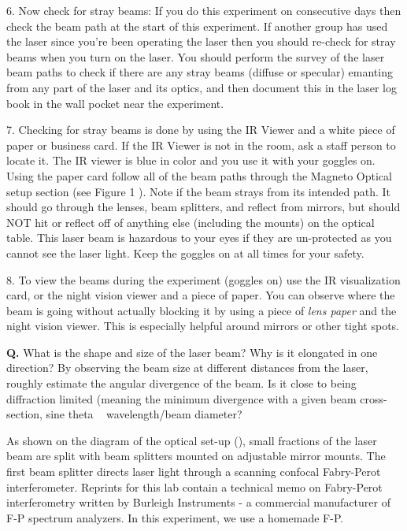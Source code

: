 \documentclass{../lab}
\begin{document}
6. Now check for stray beams: If you do this experiment on consecutive days then check the beam path at the start of this experiment. If another group has used the laser since you're been operating the laser then you should re-check for stray beams when you turn on the laser. You should perform the survey of the laser beam paths to check if there are any stray beams (diffuse or specular) emanting from any part of the laser and its optics, and then document this in the laser log book in the wall pocket near the experiment.

7. Checking for stray beams is done by using the IR Viewer and a white piece of paper or business card. If the IR Viewer is not in the room, ask a staff person to locate it. The IR viewer is blue in color and you use it with your goggles on. Using the paper card follow all of the beam paths through the Magneto Optical setup section (see Figure 1 ). Note if the beam strays from its intended path. It should go through the lenses, beam splitters, and reflect from mirrors, but should NOT hit or reflect off of anything else (including the mounts) on the optical table. This laser beam is hazardous to your eyes if they are un-protected as you cannot see the laser light. Keep the goggles on at all times for your safety.

8. To view the beams during the experiment (goggles on) use the IR visualization card, or the night vision viewer and a piece of paper. You can observe where the beam is going without actually blocking it by using a piece of \emph{lens paper} and the night vision viewer. This is especially helpful around mirrors or other tight spots.

\textbf{Q.} What is the shape and size of the laser beam? Why is it elongated in one direction? By observing the beam size at different distances from the laser, roughly estimate the angular divergence of the beam. Is it close to being diffraction limited (meaning the minimum divergence with a given beam cross-section, sine theta ~ wavelength/beam diameter?

As shown on the diagram of the optical set-up (), small fractions of the laser beam are split with beam splitters mounted on adjustable mirror mounts. The first beam splitter directs laser light through a scanning confocal Fabry-Perot interferometer. Reprints for this lab contain a technical memo on Fabry-Perot interferometry written by Burleigh Instruments - a commercial manufacturer of F-P spectrum analyzers. In this experiment, we use a homemade F-P.
\end{document}
